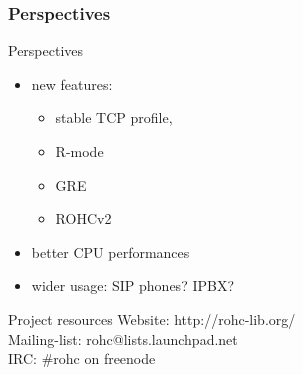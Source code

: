 \documentclass[utf8]{beamer}
\begin{document}
\begin{frame}
	\frametitle{Perspectives}
	\begin{block}{Perspectives}
		\begin{itemize}
			\item new features:
				\begin{itemize}
					\item stable TCP profile,
					\item R-mode
					\item GRE
					\item ROHCv2
				\end{itemize}
			\item better CPU performances
			\item wider usage: SIP phones? IPBX?
		\end{itemize}
	\end{block}
	\begin{block}{Project resources}
	Website: http://rohc-lib.org/\\
	Mailing-list: rohc@lists.launchpad.net\\
	IRC: \#rohc on freenode\\
	\end{block}
\end{frame}


\end{document}

